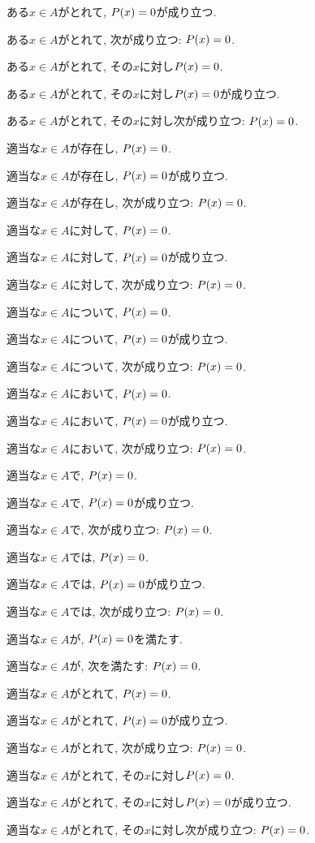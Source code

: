 \item ある$x\in A$がとれて, $P(x)=0$が成り立つ.
\item ある$x\in A$がとれて, 次が成り立つ: $P(x)=0$.
\item ある$x\in A$がとれて, その$x$に対し$P(x)=0$.
\item ある$x\in A$がとれて, その$x$に対し$P(x)=0$が成り立つ.
\item ある$x\in A$がとれて, その$x$に対し次が成り立つ: $P(x)=0$.
\item 適当な$x\in A$が存在し, $P(x)=0$.
\item 適当な$x\in A$が存在し, $P(x)=0$が成り立つ.
\item 適当な$x\in A$が存在し, 次が成り立つ: $P(x)=0$.
\item 適当な$x\in A$に対して, $P(x)=0$.
\item 適当な$x\in A$に対して, $P(x)=0$が成り立つ.
\item 適当な$x\in A$に対して, 次が成り立つ: $P(x)=0$.
\item 適当な$x\in A$について, $P(x)=0$.
\item 適当な$x\in A$について, $P(x)=0$が成り立つ.
\item 適当な$x\in A$について, 次が成り立つ: $P(x)=0$.
\item 適当な$x\in A$において, $P(x)=0$.
\item 適当な$x\in A$において, $P(x)=0$が成り立つ.
\item 適当な$x\in A$において, 次が成り立つ: $P(x)=0$.
\item 適当な$x\in A$で, $P(x)=0$.
\item 適当な$x\in A$で, $P(x)=0$が成り立つ.
\item 適当な$x\in A$で, 次が成り立つ: $P(x)=0$.
\item 適当な$x\in A$では, $P(x)=0$.
\item 適当な$x\in A$では, $P(x)=0$が成り立つ.
\item 適当な$x\in A$では, 次が成り立つ: $P(x)=0$.
\item 適当な$x\in A$が, $P(x)=0$を満たす.
\item 適当な$x\in A$が, 次を満たす: $P(x)=0$.
\item 適当な$x\in A$がとれて, $P(x)=0$.
\item 適当な$x\in A$がとれて, $P(x)=0$が成り立つ.
\item 適当な$x\in A$がとれて, 次が成り立つ: $P(x)=0$.
\item 適当な$x\in A$がとれて, その$x$に対し$P(x)=0$.
\item 適当な$x\in A$がとれて, その$x$に対し$P(x)=0$が成り立つ.
\item 適当な$x\in A$がとれて, その$x$に対し次が成り立つ: $P(x)=0$.
